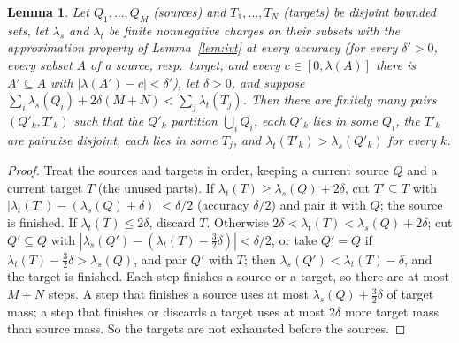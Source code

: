 \documentclass[11pt]{article}
\newtheorem{lemma}[theorem]{Lemma}
\theoremstyle{definition}\newtheorem{definition}[theorem]{Definition}
\theoremstyle{remark}\newtheorem{remark}[theorem]{Remark}
\begin{document}
\begin{lemma}\label{lem:matching}
Let $Q_1,\dots,Q_M$ (sources) and $T_1,\dots,T_N$ (targets) be disjoint
bounded sets, let $\lambda_s$ and $\lambda_t$ be finite nonnegative charges on
their subsets with the approximation property of Lemma~\ref{lem:ivt}
at every accuracy (for every $\delta'>0$, every subset $A$ of a source,
resp.\ target, and every $c\in[0,\lambda(A)]$ there is $A'\subseteq A$ with
$|\lambda(A')-c|<\delta'$), let $\delta>0$, and suppose
$\sum_i\lambda_s(Q_i)+2\delta(M+N)<\sum_j\lambda_t(T_j)$. Then there are
finitely many pairs $(Q'_k,T'_k)$ such that the $Q'_k$ partition
$\bigcup_iQ_i$, each $Q'_k$ lies in some $Q_i$, the $T'_k$ are pairwise
disjoint, each lies in some $T_j$, and $\lambda_t(T'_k)>\lambda_s(Q'_k)$ for
every $k$.
\end{lemma}
\begin{proof}
Treat the sources and targets in order, keeping a current source $Q$ and a
current target $T$ (the unused parts). If
$\lambda_t(T)\ge\lambda_s(Q)+2\delta$, cut $T'\subseteq T$ with
$|\lambda_t(T')-(\lambda_s(Q)+\delta)|<\delta/2$ (accuracy $\delta/2$)
and pair it with $Q$; the
source is finished. If $\lambda_t(T)\le2\delta$, discard $T$. Otherwise
$2\delta<\lambda_t(T)<\lambda_s(Q)+2\delta$; cut $Q'\subseteq Q$ with
$|\lambda_s(Q')-(\lambda_t(T)-\frac32\delta)|<\delta/2$, or take $Q'=Q$ if
$\lambda_t(T)-\frac32\delta>\lambda_s(Q)$, and pair $Q'$ with $T$; then
$\lambda_s(Q')<\lambda_t(T)-\delta$, and the target is finished. Each step finishes a source or a target, so
there are at most $M+N$ steps. A step that finishes a source uses at most
$\lambda_s(Q)+\frac32\delta$ of target mass; a step that finishes or discards
a target uses at most $2\delta$ more target mass than source mass. So the
targets are not exhausted before the sources.
\end{proof}
\end{document}
